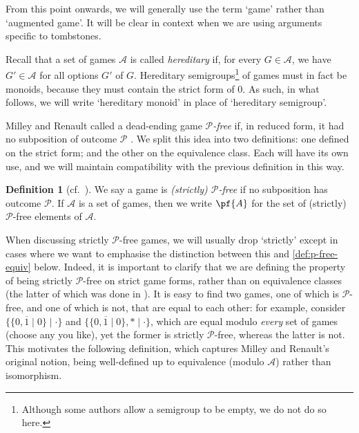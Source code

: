 \documentclass[11pt]{article}
\theoremstyle{definition}
\newtheorem{definition}[theorem]{Definition}
\newcommand{\set}[1]{\mathcal{#1}}
\begin{document}
From this point onwards, we will generally use the term `game' rather than
`augmented game'. It will be clear in context when we are using arguments
specific to tombstones.

Recall that a set of games $\set{A}$ is called \emph{hereditary} if, for every
$G\in\set{A}$, we have $G'\in\set{A}$ for all options $G'$ of $G$. Hereditary
semigroups\footnote{
    Although some authors allow a semigroup to be empty, we do not do so here.
}
of games must in fact be monoids, because they must contain the strict form of
0. As such, in what follows, we will write `hereditary monoid' in place of
`hereditary semigroup'.

Milley and Renault called a dead-ending game \emph{$\mathscr{P}$-free} if, in
reduced form, it had no subposition of outcome $\mathscr{P}$ \cite[Definition 1
on p.~2]{milley.renault:invertible}. We split this idea into two definitions:
one defined on the strict form; and the other on the equivalence class. Each
will have its own use, and we will maintain compatibility with the previous
definition in this way.

\begin{definition}[cf.\ {\cite[Definition 1 on
    p.~2]{milley.renault:invertible}}]
    We say a game is \emph{(strictly) $\mathscr{P}$-free} if no subposition has
    outcome $\mathscr{P}$. If $\set{A}$ is a set of games, then we write
    $\pf{A}$ for the set of (strictly) $\mathscr{P}$-free elements of
    $\set{A}$.
\end{definition}

When discussing strictly $\mathscr{P}$-free games, we will usually drop
`strictly' except in cases where we want to emphasise the distinction between
this and \cref{def:p-free-equiv} below. Indeed, it is important to clarify that
we are defining the property of being strictly $\mathscr{P}$-free on strict
game forms, rather than on equivalence classes (the latter of which was done in
\cite{milley.renault:invertible}). It is easy to find two games, one of which
is $\mathscr{P}$-free, and one of which is not, that are equal to each other:
for example, consider $\{\{0,\overline{1}\mid0\}\mid\cdot\}$ and
$\{\{0,\overline{1}\mid0\},*\mid\cdot\}$, which are equal modulo \emph{every}
set of games (choose any you like), yet the former is strictly
$\mathscr{P}$-free, whereas the latter is not. This motivates the following
definition, which captures Milley and Renault's original notion, being
well-defined up to equivalence (modulo $\set{A}$) rather than isomorphism.
\end{document}
